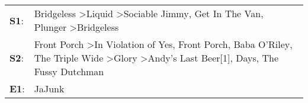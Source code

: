 \begin{supertabular}{p{0.03\textwidth}p{0.92\textwidth}}
 \textbf{S1}:  &                                                                                                                                                 Bridgeless\textsuperscript{} \textgreater \enspace Liquid\textsuperscript{} \textgreater \enspace Sociable Jimmy\textsuperscript{}, \enspace Get In The Van\textsuperscript{}, \enspace Plunger\textsuperscript{} \textgreater \enspace Bridgeless\textsuperscript{}  \enspace  \\
 \textbf{S2}:  &  Front Porch\textsuperscript{} \textgreater \enspace In Violation of Yes\textsuperscript{}, \enspace Front Porch\textsuperscript{}, \enspace Baba O'Riley\textsuperscript{}, \enspace The Triple Wide\textsuperscript{} \textgreater \enspace Glory\textsuperscript{} \textgreater \enspace Andy's Last Beer[1]\textsuperscript{},  Days\textsuperscript{}, \enspace The Fussy Dutchman\textsuperscript{}  \enspace  \\
 \textbf{E1}:  &                                                                                                                                                                                                                                                                                                                                                                                             JaJunk\textsuperscript{}  \enspace  \\
\end{supertabular}
